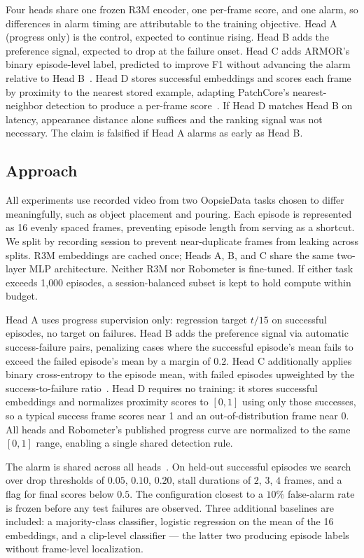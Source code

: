 \documentclass{article}
\begin{document}
Four heads share one frozen R3M encoder, one per-frame score, and one alarm, so differences in alarm timing are attributable to the training objective. Head A (progress only) is the control, expected to continue rising. Head B adds the preference signal, expected to drop at the failure onset. Head C adds ARMOR's binary episode-level label, predicted to improve F1 without advancing the alarm relative to Head B~\citep{armor}. Head D stores successful embeddings and scores each frame by proximity to the nearest stored example, adapting PatchCore's nearest-neighbor detection to produce a per-frame score~\citep{patchcore}. If Head D matches Head B on latency, appearance distance alone suffices and the ranking signal was not necessary. The claim is falsified if Head A alarms as early as Head B.

\subsection{Approach}
All experiments use recorded video from two OopsieData tasks chosen to differ meaningfully, such as object placement and pouring. Each episode is represented as 16 evenly spaced frames, preventing episode length from serving as a shortcut. We split by recording session to prevent near-duplicate frames from leaking across splits. R3M embeddings are cached once; Heads A, B, and C share the same two-layer MLP architecture. Neither R3M nor Robometer is fine-tuned. If either task exceeds 1{,}000 episodes, a session-balanced subset is kept to hold compute within budget.

Head A uses progress supervision only: regression target $t/15$ on successful episodes, no target on failures. Head B adds the preference signal via automatic success-failure pairs, penalizing cases where the successful episode's mean fails to exceed the failed episode's mean by a margin of $0.2$. Head C additionally applies binary cross-entropy to the episode mean, with failed episodes upweighted by the success-to-failure ratio~\citep{armor}. Head D requires no training: it stores successful embeddings and normalizes proximity scores to $[0,1]$ using only those successes, so a typical success frame scores near 1 and an out-of-distribution frame near 0. All heads and Robometer's published progress curve are normalized to the same $[0,1]$ range, enabling a single shared detection rule.

The alarm is shared across all heads~\citep{robometer,foresight}. On held-out successful episodes we search over drop thresholds of $0.05$, $0.10$, $0.20$, stall durations of $2$, $3$, $4$ frames, and a flag for final scores below $0.5$. The configuration closest to a $10\%$ false-alarm rate is frozen before any test failures are observed. Three additional baselines are included: a majority-class classifier, logistic regression on the mean of the 16 embeddings, and a clip-level classifier — the latter two producing episode labels without frame-level localization.
\end{document}
